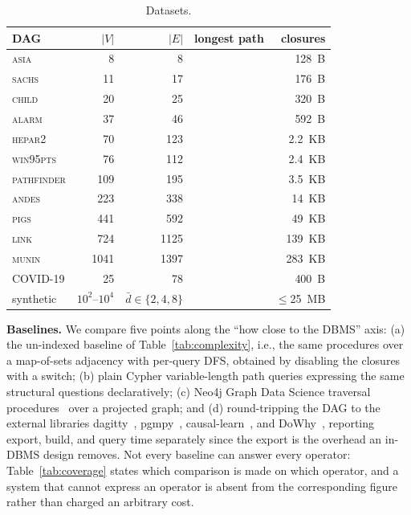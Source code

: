 \begin{table}[t]\centering
\caption{Datasets. }
\label{tab:datasets}
\footnotesize
\setlength{\tabcolsep}{3pt}
\begin{tabular}{@{}lrrrr@{}}
\toprule
DAG & $|V|$ & $|E|$ & longest path & closures \\
\midrule
\textsc{asia}       &    8 &    8 & \TODO{} & 128~B \\
\textsc{sachs}      &   11 &   17 & \TODO{} & 176~B \\
\textsc{child}      &   20 &   25 & \TODO{} & 320~B \\
\textsc{alarm}      &   37 &   46 & \TODO{} & 592~B \\
\textsc{hepar2}     &   70 &  123 & \TODO{} & 2.2~KB \\
\textsc{win95pts}   &   76 &  112 & \TODO{} & 2.4~KB \\
\textsc{pathfinder} &  109 &  195 & \TODO{} & 3.5~KB \\
\textsc{andes}      &  223 &  338 & \TODO{} & 14~KB \\
\textsc{pigs}       &  441 &  592 & \TODO{} & 49~KB \\
\textsc{link}       &  724 & 1125 & \TODO{} & 139~KB \\
\textsc{munin}      & 1041 & 1397 & \TODO{} & 283~KB \\
COVID-19            &   25 &   78 & \TODO{} & 400~B \\
synthetic           & $10^2$--$10^4$ & $\bar d{\in}\{2,4,8\}$ & & $\le$25~MB \\
\bottomrule
\end{tabular}
\end{table}

\noindent\textbf{Baselines.} We compare five points along the ``how close to
the DBMS'' axis: (a) the un-indexed baseline of Table~\ref{tab:complexity},
i.e., the same procedures over a map-of-sets adjacency with per-query DFS,
obtained by disabling the closures with a switch; (b) plain Cypher
variable-length path queries expressing the same structural questions
declaratively; (c) Neo4j Graph Data Science traversal
procedures~\cite{neo4jgds} over a projected graph; and (d) round-tripping the
DAG to the external libraries dagitty~\cite{textor2016dagitty},
pgmpy~\cite{ankan2024pgmpy}, causal-learn~\cite{zheng2024causallearn}, and
DoWhy~\cite{sharma2020dowhy}, reporting export, build, and query time
separately since the export is the overhead an in-DBMS design removes. Not
every baseline can answer every operator: Table~\ref{tab:coverage} states
which comparison is made on which operator, and a system that cannot express
an operator is absent from the corresponding figure rather than charged an
arbitrary cost.

